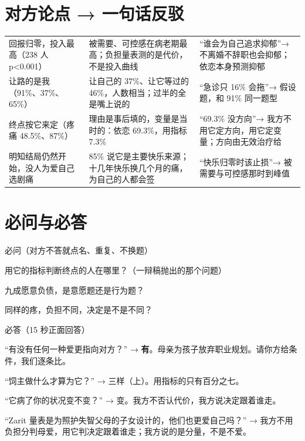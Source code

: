 \documentclass[quick,con]{debate}
\begin{document}
\section{对方论点 → 一句话反驳}
\begin{tabularx}{\linewidth}{@{}Y Y Y@{}}\toprule
{}&&\\\midrule
回报归零，投入最高（238 人 p<0.001）&被需要、可控感在病老期最高；负担量表测的是代价，不是投入曲线&“谁会为自己追求抑郁”→ 不离婚不辞职也会抑郁；依恋本身预测抑郁\\
让路的是我（91\%、37\%、65\%）&让自己的 37\%、让它等过的 46\%，人数相当；过半的全是嘴上说的&“急诊只 16\% 会拖”→ 假设题，和 91\% 同一题型\\
终点按它来定（疼痛 48.5\%、87\%）&理由是事后填的，变量是当时的：依恋 69.3\%，用指标 7.3\%&“69.3\% 没方向”→ 我方不用它定方向，用它定变量；方向由无效治疗给\\
明知结局仍然开始，没人为爱自己选剧痛&85\% 说它是主要快乐来源；十几年快乐换几个月的痛，为自己的人都会签&“快乐归零时该止损”→ 被需要与可控感那时到峰值\\
\bottomrule\end{tabularx}
\section{必问与必答}
\begin{points}{必问（对方不答就点名、重复、不换题）}
\item 用它的指标判断终点的人在哪里？（一辩稿抛出的那个问题）
\item 九成愿意负债，是意愿题还是行为题？
\item 同样的疼，负担不同，决定是不是不同？
\end{points}
\begin{points}{必答（15 秒正面回答）}
\item “有没有任何一种爱更指向对方？” → \textbf{有}。母亲为孩子放弃职业规划。请你方给条件，我们逐条比。
\item “饲主做什么才算为它？” → 三样（上）。用指标的只有百分之七。
\item “它病了你的状况变不变？” → 变。我方不否认代价，我方说决定跟着谁走。
\item “Zarit 量表是为照护失智父母的子女设计的，他们也更爱自己吗？” → 我方不用负担分判母爱，用它判决定跟着谁走；我方说的是分量，不是不爱。
\end{points}
\end{document}
